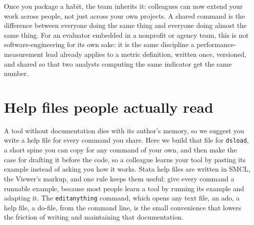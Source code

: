 \documentclass[
    a4paper,
    fontsize=10pt,
    twoside=true,
    numbers=noenddot,
]{kaobook}
\begin{document}
Once you package a habit, the team inherits it: colleagues can now extend your work across people, not just across your own projects. A shared command is the difference between everyone doing the same thing and everyone doing almost the same thing. For an evaluator embedded in a nonprofit or agency team, this is not software-engineering for its own sake: it is the same discipline a performance-measurement lead already applies to a metric definition, written once, versioned, and shared so that two analysts computing the same indicator get the same number.

\section{Help files people actually read}
A tool without documentation dies with its author's memory, so we suggest you write a help file for every command you share. Here we build that file for \texttt{dsload}, a short spine you can copy for any command of your own, and then make the case for drafting it before the code, so a colleague learns your tool by pasting its example instead of asking you how it works. Stata help files are written in SMCL, the Viewer's markup, and one rule keeps them useful: give every command a runnable example, because most people learn a tool by running its example and adapting it. The \texttt{editanything} command, which opens any text file, an ado, a help file, a do-file, from the command line, is the small convenience that lowers the friction of writing and maintaining that documentation.
\end{document}
